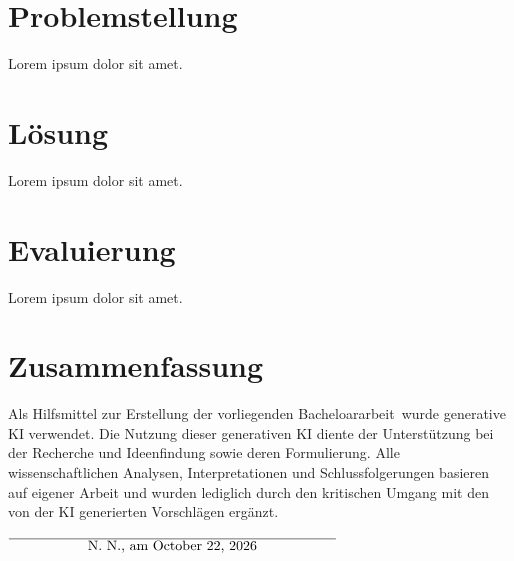 \documentclass[12pt,twoside=false,a4paper,parskip]{scrbook}
\def\BaAuthor{Fabian Frank Werner}
\def\ShowBaAuthor{\BaAuthor}
\def\ShowBaAuthor{N.~N.}
\begin{document}
\chapter{Problemstellung}

Lorem ipsum dolor sit amet.

\chapter{Lösung}

Lorem ipsum dolor sit amet.

\chapter{Evaluierung}

Lorem ipsum dolor sit amet.

\chapter{Zusammenfassung}

\backmatter


\appendix
{}


\cleardoublepage
{}


\printbibliography[title=References]


Als Hilfsmittel zur Erstellung der vorliegenden Bacheloararbeit wurde generative KI verwendet. Die Nutzung dieser generativen KI diente der Unterstützung bei der Recherche und Ideenfindung sowie deren Formulierung. Alle wissenschaftlichen Analysen, Interpretationen und Schlussfolgerungen basieren auf eigener Arbeit und wurden lediglich durch den kritischen Umgang mit den von der KI generierten Vorschlägen ergänzt.
\vspace{20pt}
\begin{flushright}
$\overline{~~~~~~~~~~~~~~~~~\mbox{\ShowBaAuthor, am \today}~~~~~~~~~~~~~~~~~}$
\end{flushright}
\end{document}
